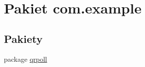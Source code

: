 \hypertarget{namespacecom_1_1example}{\section{Pakiet com.\+example}
\label{namespacecom_1_1example}
}
\subsection*{Pakiety}
\begin{DoxyCompactItemize}
\item 
package \hyperlink{namespacecom_1_1example_1_1qrpoll}{qrpoll}
\end{DoxyCompactItemize}
